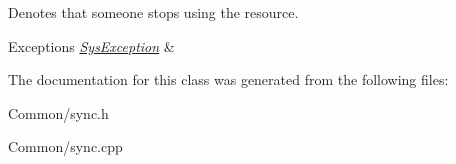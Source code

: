 Denotes that someone stops using the resource. 


\begin{DoxyExceptions}{Exceptions}
{\em \hyperlink{class_common_1_1_sys_exception}{Sys\-Exception}} & \\
\hline
\end{DoxyExceptions}


The documentation for this class was generated from the following files\-:\begin{DoxyCompactItemize}
\item 
Common/sync.\-h\item 
Common/sync.\-cpp\end{DoxyCompactItemize}
